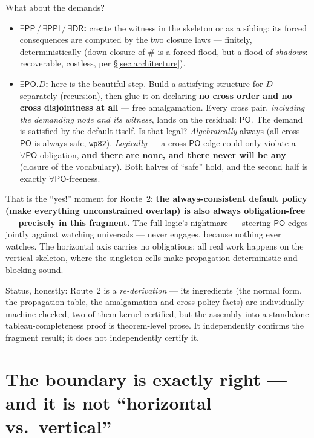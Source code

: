 \documentclass[11pt]{article}
\newcommand{\DR}{\ensuremath{\mathsf{DR}}}
\newcommand{\PO}{\ensuremath{\mathsf{PO}}}
\newcommand{\PP}{\ensuremath{\mathsf{PP}}}
\newcommand{\PPI}{\ensuremath{\mathsf{PPI}}}
\newcommand{\code}[1]{\texttt{#1}}
\begin{document}
What about the demands?
\begin{itemize}
\item \textbf{$\exists\PP\,/\,\exists\PPI\,/\,\exists\DR$:} create the
  witness in the skeleton or as a sibling; its forced consequences are
  computed by the two closure laws --- finitely, deterministically
  (down-closure of ${\#}$ is a forced flood, but a flood of
  \emph{shadows}: recoverable, costless, per \S\ref{sec:architecture}).
\item \textbf{$\exists\PO.D$:} here is the beautiful step. Build a
  satisfying structure for $D$ separately (recursion), then glue it on
  declaring \textbf{no cross order and no cross disjointness at all}
  --- free amalgamation. Every cross pair, \emph{including the
  demanding node and its witness}, lands on the residual: $\PO$. The
  demand is satisfied by the default itself. Is that legal?
  \emph{Algebraically} always (all-cross $\PO$ is always safe,
  \code{wp82}). \emph{Logically} --- a cross-$\PO$ edge could only
  violate a $\forall\PO$ obligation, \textbf{and there are none, and
  there never will be any} (closure of the vocabulary). Both halves of
  ``safe'' hold, and the second half is exactly $\forall\PO$-freeness.
\end{itemize}

That is the ``yes!'' moment for Route~2: \textbf{the always-consistent
default policy (make everything unconstrained overlap) is also always
obligation-free --- precisely in this fragment.} The full logic's
nightmare --- steering $\PO$ edges jointly against watching universals
--- never engages, because nothing ever watches. The horizontal axis
carries no obligations; all real work happens on the vertical skeleton,
where the singleton cells make propagation deterministic and blocking
sound.

Status, honestly: Route~2 is a \emph{re-derivation} --- its ingredients
(the normal form, the propagation table, the amalgamation and
cross-policy facts) are individually machine-checked, two of them
kernel-certified, but the assembly into a standalone
tableau-completeness proof is theorem-level prose. It independently
confirms the fragment result; it does not independently certify it.

\section{The boundary is exactly right --- and it is not ``horizontal
vs.\ vertical''}\label{sec:boundary}
\end{document}
